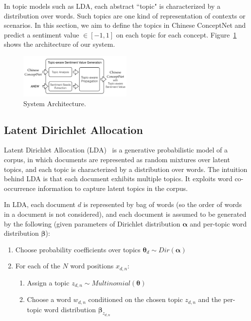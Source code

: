 In topic models such as LDA, each abstract ``topic" is characterized by a distribution over words. Such topics are one kind of representation of contexts or scenarios. In this section, we aim to define the topics in Chinese ConceptNet and predict a sentiment value $\in [-1,1]$ on each topic for each concept. Figure~\ref{fig:system1} shows the architecture of our system.

\begin{figure}[!t]
\centering
\includegraphics[width=0.5\textwidth]{fig/system1.png}
\caption{System Architecture.}
\label{fig:system1}
\end{figure}

\subsection{Latent Dirichlet Allocation}
Latent Dirichlet Allocation (LDA)~\cite{Blei:LDA03} is a generative probabilistic model of a corpus, in which documents are represented as random mixtures over latent topics, and each topic is characterized by a distribution over words. The intuition behind LDA is that each document exhibits multiple topics. It exploits word co-occurrence information to capture latent topics in the corpus.

In LDA, each document $d$ is represented by bag of words (so the order of words in a document is not considered), and each document is assumed to be generated by the following (given parameters of Dirichlet distribution $\boldsymbol{\alpha}$ and per-topic word distribution $\boldsymbol{\beta}$):
\begin{enumerate}[]
	\item Choose probability coefficients over topics $\boldsymbol{\theta}_d {\sim} Dir(\boldsymbol{\alpha})$
	\item For each of the $N$ word positions $x_{d,n}$:
	\begin{enumerate}
		\item Assign a topic $z_{d,n} {\sim} Multinomial(\boldsymbol{\theta})$
		\item Choose a word $w_{d,n}$ conditioned on the chosen topic $z_{d,n}$ and the per-topic word distribution $\boldsymbol{\beta}_{z_{d,n}}$
	\end{enumerate}
\end{enumerate}

